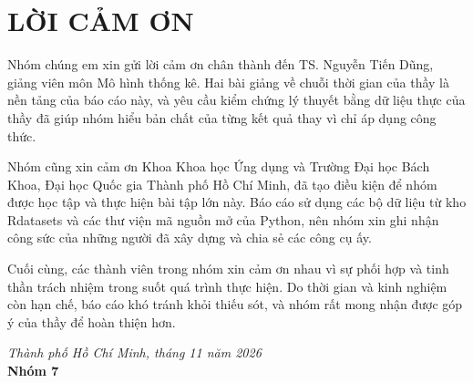 \clearpage
{}
\section*{LỜI CẢM ƠN}

Nhóm chúng em xin gửi lời cảm ơn chân thành đến TS. Nguyễn Tiến Dũng, giảng viên môn Mô hình thống kê. Hai bài giảng về chuỗi thời gian của thầy là nền tảng của báo cáo này, và yêu cầu kiểm chứng lý thuyết bằng dữ liệu thực của thầy đã giúp nhóm hiểu bản chất của từng kết quả thay vì chỉ áp dụng công thức.

Nhóm cũng xin cảm ơn Khoa Khoa học Ứng dụng và Trường Đại học Bách Khoa, Đại học Quốc gia Thành phố Hồ Chí Minh, đã tạo điều kiện để nhóm được học tập và thực hiện bài tập lớn này. Báo cáo sử dụng các bộ dữ liệu từ kho Rdatasets và các thư viện mã nguồn mở của Python, nên nhóm xin ghi nhận công sức của những người đã xây dựng và chia sẻ các công cụ ấy.

Cuối cùng, các thành viên trong nhóm xin cảm ơn nhau vì sự phối hợp và tinh thần trách nhiệm trong suốt quá trình thực hiện. Do thời gian và kinh nghiệm còn hạn chế, báo cáo khó tránh khỏi thiếu sót, và nhóm rất mong nhận được góp ý của thầy để hoàn thiện hơn.

\vspace{1cm}
\hfill\begin{minipage}{8cm}
\centering
\textit{Thành phố Hồ Chí Minh, tháng 11 năm 2026}\\[2pt]
\textbf{Nhóm 7}
\end{minipage}\par
